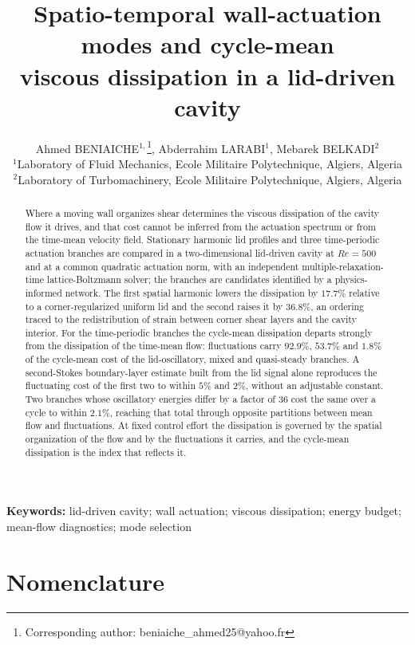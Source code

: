 \documentclass[11pt,a4paper]{article}
\title{\bfseries Spatio-temporal wall-actuation modes and cycle-mean\\
viscous dissipation in a lid-driven cavity}
\author{ Ahmed BENIAICHE$^{1,}$\thanks{Corresponding author: beniaiche\_ahmed25@yahoo.fr},  Abderrahim LARABI$^{1}$,  Mebarek BELKADI$^{2}$\\[4pt]
$^{1}$Laboratory of Fluid Mechanics, Ecole Militaire Polytechnique, Algiers, Algeria\\
$^{2}$Laboratory of Turbomachinery, Ecole Militaire Polytechnique, Algiers, Algeria}
\date{}
\begin{document}
\maketitle

\begin{abstract}
Where a moving wall organizes shear determines the viscous dissipation of the
cavity flow it drives, and that cost cannot be inferred from the actuation
spectrum or from the time-mean velocity field. Stationary harmonic lid profiles
and three time-periodic actuation branches are compared in a two-dimensional
lid-driven cavity at $Re=500$ and at a common quadratic actuation norm, with an
independent multiple-relaxation-time lattice-Boltzmann solver; the branches are
candidates identified by a physics-informed network. The first spatial harmonic
lowers the dissipation by $17.7\%$ relative to a corner-regularized uniform lid
and the second raises it by $36.8\%$, an ordering traced to the redistribution
of strain between corner shear layers and the cavity interior. For the
time-periodic branches the cycle-mean dissipation departs strongly from the
dissipation of the time-mean flow: fluctuations carry $92.9\%$, $53.7\%$ and
$1.8\%$ of the cycle-mean cost of the lid-oscillatory, mixed and quasi-steady
branches. A second-Stokes boundary-layer estimate built from the lid signal
alone reproduces the fluctuating cost of the first two to within $5\%$ and
$2\%$, without an adjustable constant. Two branches whose oscillatory energies
differ by a factor of $36$ cost the same over a cycle to within $2.1\%$,
reaching that total through opposite partitions between mean flow and
fluctuations. At fixed control effort the dissipation is governed by the spatial
organization of the flow and by the fluctuations it carries, and the cycle-mean
dissipation is the index that reflects it.
\end{abstract}

\noindent\textbf{Keywords:} lid-driven cavity; wall actuation; viscous dissipation;
energy budget; mean-flow diagnostics; mode selection

\section*{Nomenclature}
\end{document}
